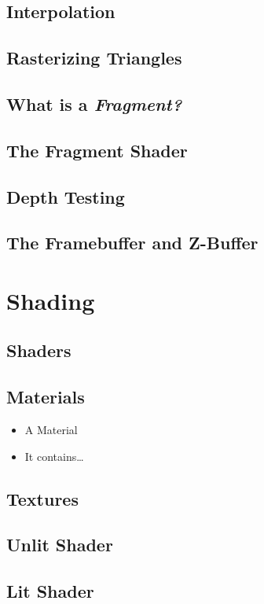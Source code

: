 \documentclass{article}
\begin{document}
\subsection{Interpolation}
\subsection{Rasterizing Triangles}
\subsection{What is a \textit{Fragment?}}
\subsection{The Fragment Shader}
\subsection{Depth Testing}
\subsection{The Framebuffer and Z-Buffer}

\section{Shading}

\subsection{Shaders}
\subsection{Materials}
\begin{itemize}
	\item A Material
	\item It contains\ldots
\end{itemize}

\subsection{Textures}
\subsection{Unlit Shader}
\subsection{Lit Shader}
\end{document}
